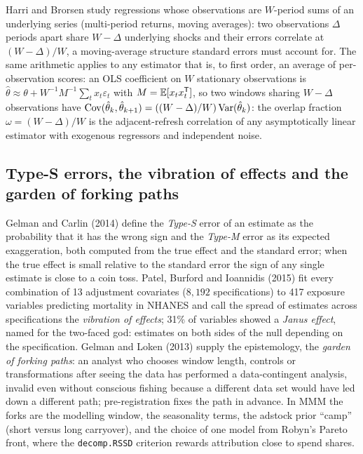 Harri and Brorsen study regressions whose observations are $W$-period sums of an underlying series (multi-period returns, moving averages): two observations $\Delta$ periods apart share $W - \Delta$ underlying shocks and their errors correlate at $(W-\Delta)/W$, a moving-average structure standard errors must account for. The same arithmetic applies to any estimator that is, to first order, an average of per-observation scores: an OLS coefficient on $W$ stationary observations is $\hat\theta \approx \theta + W^{-1}M^{-1}\sum_{t} x_t\varepsilon_t$ with $M = \mathbb{E}[x_tx_t^{\mathsf{T}}]$, so two windows sharing $W - \Delta$ observations have $\operatorname{Cov}(\hat\theta_k, \hat\theta_{k+1}) = ((W-\Delta)/W)\operatorname{Var}(\hat\theta_k)$: the overlap fraction $\omega = (W-\Delta)/W$ is the adjacent-refresh correlation of any asymptotically linear estimator with exogenous regressors and independent noise.

\subsection{Type-S errors, the vibration of effects and the garden of forking paths}

Gelman and Carlin (2014) define the \emph{Type-S} error of an estimate as the probability that it has the wrong sign and the \emph{Type-M} error as its expected exaggeration, both computed from the true effect and the standard error; when the true effect is small relative to the standard error the sign of any single estimate is close to a coin toss. Patel, Burford and Ioannidis (2015) fit every combination of 13 adjustment covariates ($8{,}192$ specifications) to 417 exposure variables predicting mortality in NHANES and call the spread of estimates across specifications the \emph{vibration of effects}; 31\% of variables showed a \emph{Janus effect}, named for the two-faced god: estimates on both sides of the null depending on the specification. Gelman and Loken (2013) supply the epistemology, the \emph{garden of forking paths}: an analyst who chooses window length, controls or transformations after seeing the data has performed a data-contingent analysis, invalid even without conscious fishing because a different data set would have led down a different path; pre-registration fixes the path in advance. In MMM the forks are the modelling window, the seasonality terms, the adstock prior ``camp'' (short versus long carryover), and the choice of one model from Robyn's Pareto front, where the \texttt{decomp.RSSD} criterion rewards attribution close to spend shares.

